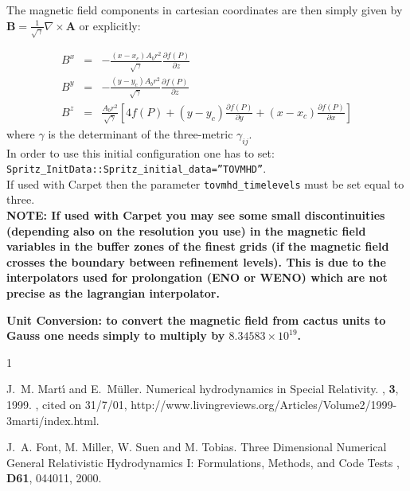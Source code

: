 \documentclass{article}
\begin{document}
The magnetic field components in cartesian coordinates are then simply
given by $\mathbf{B}=\frac{1}{\sqrt{\gamma}}\nabla \times \mathbf{A}$
or explicitly:

\begin{eqnarray}
B^x &=& -\frac{(x-x_c) A_b r^2}{\sqrt{\gamma}} \frac{\partial f(P)}{\partial z} \\
B^y &=& -\frac{(y-y_c) A_b r^2}{\sqrt{\gamma}} \frac{\partial f(P)}{\partial z} \\
B^z &=& \frac{A_b r^2}{\sqrt{\gamma}}\left[4f(P)+(y-y_c)\frac{\partial f(P)}{\partial y} +(x-x_c)\frac{\partial f(P)}{\partial x}\right]
\end{eqnarray}
%
where $\gamma$ is the determinant of the three-metric $\gamma_{ij}$.\\

In order to use this initial configuration one has to set:\\ 
%
{\tt Spritz\_InitData::Spritz\_initial\_data=''TOVMHD''}.\\
%

If used with Carpet then the parameter {\tt tovmhd\_timelevels} must
 be set equal to three.\\ 
%
{\bf NOTE: If used with Carpet you may see some small discontinuities
 (depending also on the resolution you use) in the magnetic field
 variables in the buffer zones of the finest grids (if the magnetic
 field crosses the boundary between refinement levels). This is due to
 the interpolators used for prolongation (ENO or WENO) which are not
 precise as the lagrangian interpolator.}

{\bf Unit Conversion: to convert the magnetic field from cactus units
to Gauss one needs simply to multiply by $8.34583 \times 10^{19}$.}
\begin{thebibliography}{1}

J.~M. Mart{\'{\i}} and E.~M{\"u}ller.
\newblock Numerical hydrodynamics in {S}pecial {R}elativity.
, {\bf 3}, 1999.
, cited on 31/7/01,
  http://www.livingreviews.org/Articles/Volume2/1999-3marti/index.html.

J.~A. Font, M. Miller, W. Suen and M. Tobias.
\newblock Three Dimensional Numerical General Relativistic
Hydrodynamics I: Formulations, Methods, and Code Tests
, {\bf D61}, 044011, 2000.

\end{thebibliography}





\end{document}
